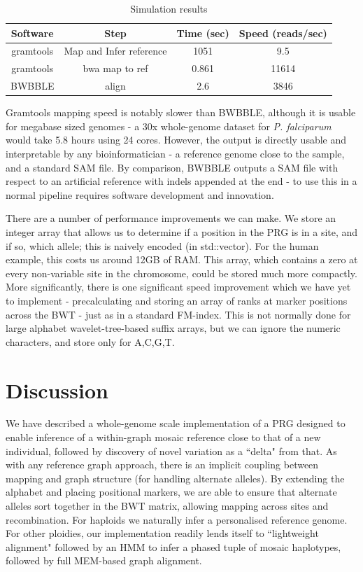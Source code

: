 \documentclass[runningheads,a4paper]{llncs}
\begin{document}
\begin{table}
\caption{Simulation results }
\centering
\begin{tabular}{c c c c}
\hline
Software  & Step & Time (sec) & Speed (reads/sec)\\
\hline
gramtools & Map and Infer reference &  1051 & 9.5 \\
gramtools & bwa map to ref & 0.861  & 11614 \\
BWBBLE  & align & 2.6 & 3846 \\ 
\hline
\end{tabular}
\end{table}

Gramtools mapping speed is notably slower than BWBBLE, although it is usable for megabase sized genomes - a 30x whole-genome dataset for \textit{P. falciparum} would take 5.8 hours using 24 cores. However, the output is directly usable and interpretable by any bioinformatician - a reference genome close to the sample, and a standard SAM file. By comparison, BWBBLE outputs a SAM file with respect to an artificial reference with indels appended at the end - to use this in a normal pipeline requires software development and innovation.

There are a number of performance improvements we can make. We store an integer array that allows us to determine if a position in the PRG is in a site, and if so, which allele; this is naively encoded (in std::vector). For the human example, this costs us around 12GB of RAM. This  array, which contains a zero at every non-variable site in the chromosome, could be stored much more compactly. More significantly, there is one significant speed improvement which we have yet to implement - precalculating and storing an array of ranks at marker positions across the BWT - just as in a standard FM-index. This is not normally done for large alphabet wavelet-tree-based suffix arrays, but we can ignore the numeric characters, and store only for A,C,G,T. 

\section{Discussion}
We have described a whole-genome scale implementation of a PRG designed to enable inference of a within-graph mosaic reference close to that of a new individual, followed by discovery of novel variation as a ``delta" from that. As with any reference graph approach, there is an implicit coupling between mapping and graph structure (for handling alternate alleles). By extending the alphabet and placing positional markers, we are able to ensure that alternate alleles sort together in the BWT matrix, allowing mapping across sites and recombination. For haploids we naturally infer a personalised reference genome. For other ploidies, our implementation readily lends itself to ``lightweight alignment" followed by an HMM to infer a phased tuple of mosaic haplotypes, followed by full MEM-based graph alignment.  
\end{document}
